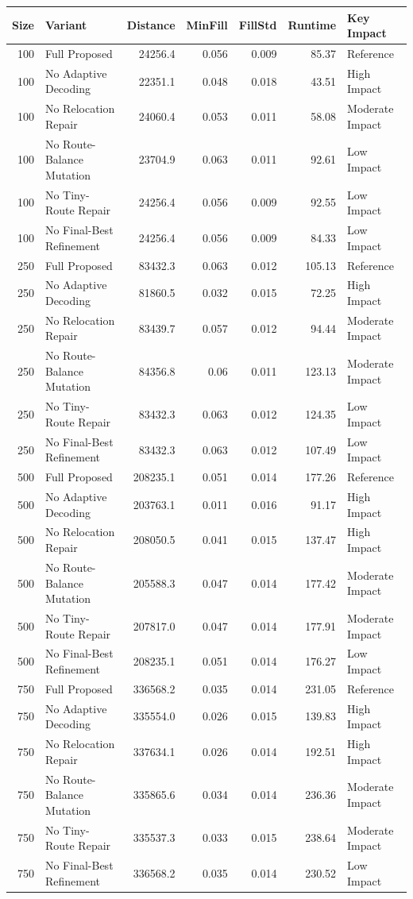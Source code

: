 \begin{tabular}{rlrrrrl}
\toprule
Size & Variant & Distance & MinFill & FillStd & Runtime & Key Impact \\
\midrule
100 & Full Proposed & 24256.4 & 0.056 & 0.009 & 85.37 & Reference \\
100 & No Adaptive Decoding & 22351.1 & 0.048 & 0.018 & 43.51 & High Impact \\
100 & No Relocation Repair & 24060.4 & 0.053 & 0.011 & 58.08 & Moderate Impact \\
100 & No Route-Balance Mutation & 23704.9 & 0.063 & 0.011 & 92.61 & Low Impact \\
100 & No Tiny-Route Repair & 24256.4 & 0.056 & 0.009 & 92.55 & Low Impact \\
100 & No Final-Best Refinement & 24256.4 & 0.056 & 0.009 & 84.33 & Low Impact \\
250 & Full Proposed & 83432.3 & 0.063 & 0.012 & 105.13 & Reference \\
250 & No Adaptive Decoding & 81860.5 & 0.032 & 0.015 & 72.25 & High Impact \\
250 & No Relocation Repair & 83439.7 & 0.057 & 0.012 & 94.44 & Moderate Impact \\
250 & No Route-Balance Mutation & 84356.8 & 0.06 & 0.011 & 123.13 & Moderate Impact \\
250 & No Tiny-Route Repair & 83432.3 & 0.063 & 0.012 & 124.35 & Low Impact \\
250 & No Final-Best Refinement & 83432.3 & 0.063 & 0.012 & 107.49 & Low Impact \\
500 & Full Proposed & 208235.1 & 0.051 & 0.014 & 177.26 & Reference \\
500 & No Adaptive Decoding & 203763.1 & 0.011 & 0.016 & 91.17 & High Impact \\
500 & No Relocation Repair & 208050.5 & 0.041 & 0.015 & 137.47 & High Impact \\
500 & No Route-Balance Mutation & 205588.3 & 0.047 & 0.014 & 177.42 & Moderate Impact \\
500 & No Tiny-Route Repair & 207817.0 & 0.047 & 0.014 & 177.91 & Moderate Impact \\
500 & No Final-Best Refinement & 208235.1 & 0.051 & 0.014 & 176.27 & Low Impact \\
750 & Full Proposed & 336568.2 & 0.035 & 0.014 & 231.05 & Reference \\
750 & No Adaptive Decoding & 335554.0 & 0.026 & 0.015 & 139.83 & High Impact \\
750 & No Relocation Repair & 337634.1 & 0.026 & 0.014 & 192.51 & High Impact \\
750 & No Route-Balance Mutation & 335865.6 & 0.034 & 0.014 & 236.36 & Moderate Impact \\
750 & No Tiny-Route Repair & 335537.3 & 0.033 & 0.015 & 238.64 & Moderate Impact \\
750 & No Final-Best Refinement & 336568.2 & 0.035 & 0.014 & 230.52 & Low Impact \\
\bottomrule
\end{tabular}
